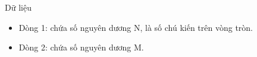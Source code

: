 Dữ liệu  
\begin{itemize}
	\item     Dòng 1: chứa số nguyên dương N, là số chú kiến trên vòng tròn.   
	\item     Dòng 2: chứa số nguyên dương M.   
\end{itemize}